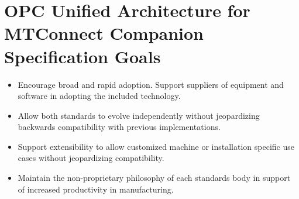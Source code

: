 \section{OPC Unified Architecture for MTConnect Companion Specification Goals}\label{goals}

\begin{itemize}
    \item Encourage broad and rapid adoption. Support suppliers of equipment and software in adopting the included technology.
    \item Allow both standards to evolve independently without jeopardizing backwards compatibility with previous implementations.
    \item Support extensibility to allow customized machine or installation specific use cases without jeopardizing compatibility.
    \item Maintain the non-proprietary philosophy of each standards body in support of increased productivity in manufacturing.
\end{itemize}
